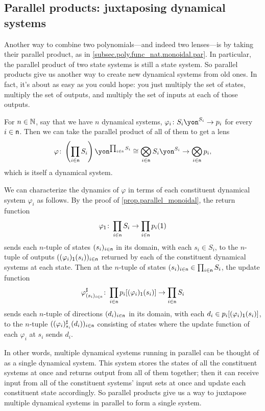\documentclass[Book-Poly]{subfiles}
\begin{document}
\subsection{Parallel products: juxtaposing dynamical systems}\label{subsec.poly.dyn_sys.new.par}

Another way to combine two polynomials---and indeed two lenses---is by taking their parallel product, as in \cref{subsec.poly.func_nat.monoidal.par}.
In particular, the parallel product of two state systems is still a state system.
So parallel products give us another way to create new dynamical systems from old ones.
In fact, it's about as easy as you could hope: you just multiply the set of states, multiply the set of outputs, and multiply the set of inputs at each of those outputs.

For $n\in\mathbb{N}$, say that we have $n$ dynamical systems, $\varphi_i\colon S_i\yon^{S_i}\to p_i$ for every $i\in\mathsf{n}$.
Then we can take the parallel product of all of them to get a lens \[\varphi\colon \left(\prod_{i\in\ord{n}}S_i\right)\yon^{\prod_{i\in\ord{n}}S_i}\iso\bigotimes_{i\in\ord{n}}S_i\yon^{S_i}\to\bigotimes_{i\in\ord{n}}p_i,\] which is itself a dynamical system.

We can characterize the dynamics of $\varphi$ in terms of each constituent dynamical system $\varphi_i$ as follows.
By the proof of \cref{prop.parallel_monoidal}, the return function \[\varphi_{\textsf{1}}\colon \prod_{i\in\mathsf{n}}S_i\to\prod_{i\in\mathsf{n}}p_i(\textsf{1})\] sends each $n$-tuple of states $(s_i)_{i\in\mathsf{n}}$ in its domain, with each $s_i\in S_i$, to the $n$-tuple of outputs $((\varphi_i)_{\textsf{1}}(s_i))_{i\in\mathsf{n}}$ returned by each of the constituent dynamical systems at each state.
Then at the $n$-tuple of states $(s_i)_{i\in\mathsf{n}}\in\prod_{i\in\mathsf{n}}S_i$, the update function \[\varphi^\sharp_{(s_i)_{i\in\mathsf{n}}}\colon\prod_{i\in\mathsf{n}}p_i[(\varphi_i)_{\textsf{1}}(s_i)]\to\prod_{i\in\mathsf{n}}S_i\] sends each $n$-tuple of directions $(d_i)_{i\in\mathsf{n}}$ in its domain, with each $d_i\in p_i[(\varphi_i)_{\textsf{1}}(s_i)]$, to the $n$-tuple $((\varphi_i)^\sharp_{s_i}(d_i))_{i\in\mathsf{n}}$ consisting of states where the update function of each $\varphi_i$ at $s_i$ sends $d_i$.

In other words, multiple dynamical systems running in parallel can be thought of as a single dynamical system.
This system stores the states of all the constituent systems at once and returns output from all of them together; then it can receive input from all of the constituent systems' input sets at once and update each constituent state accordingly.
So parallel products give us a way to juxtapose multiple dynamical systems in parallel to form a single system.
\end{document}
